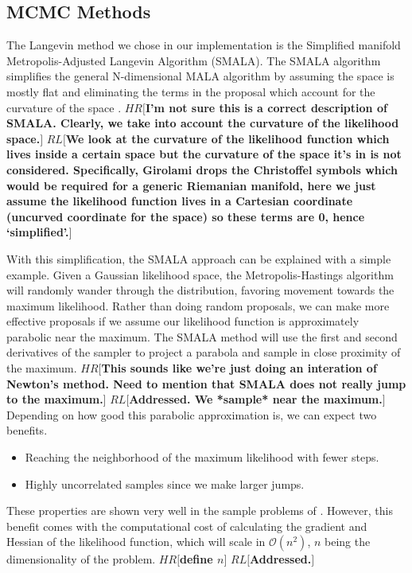 \documentclass{aa}
\def\memohr#1{\color{blue}$HR[${\bf #1}$]$ \color{black}}
\def\memorl#1{\color{gray}$RL[${\bf #1}$]$ \color{black}}
\begin{document}
\subsection{MCMC Methods}
The Langevin method we chose in our implementation is the Simplified manifold Metropolis-Adjusted Langevin Algorithm (SMALA). 
The SMALA algorithm simplifies the general N-dimensional MALA algorithm by assuming the space is mostly flat and eliminating the terms in the proposal which account for the curvature of the space \citep{Girolami2011}.
\memohr{I'm not sure this is a correct description of SMALA. Clearly, we take into account the curvature of the likelihood space.}
\memorl{We look at the curvature of the likelihood function which lives inside a certain space but the curvature of the space it's in is not considered. Specifically, Girolami drops the Christoffel symbols which would be required for a generic Riemanian manifold, here we just assume the likelihood function lives in a Cartesian coordinate (uncurved coordinate for the space) so these terms are 0, hence `simplified'.}

With this simplification, the SMALA approach can be explained with a simple example. 
Given a Gaussian likelihood space, the Metropolis-Hastings algorithm will randomly wander through the distribution, favoring movement towards the maximum likelihood.
Rather than doing random proposals, we can make more effective proposals if we assume our likelihood function is approximately parabolic near the maximum. 
The SMALA method will use the first and second derivatives of the sampler to project a parabola and sample in close proximity of the maximum. 
\memohr{This sounds like we're just doing an interation of Newton's method. Need to mention that SMALA does not really jump to the maximum.}
\memorl{Addressed. We *sample* near the maximum.}
Depending on how good this parabolic approximation is, we can expect two benefits.
\begin{itemize}
\item Reaching the neighborhood of the maximum likelihood with fewer steps.
\item Highly uncorrelated samples since we make larger jumps.
\end{itemize}
These properties are shown very well in the sample problems of \cite{Girolami2011}. 
However, this benefit comes with the computational cost of calculating the gradient and Hessian of the likelihood function, which will scale in $\mathcal{O}(n^2)$, $n$ being the dimensionality of the problem. 
\memohr{define $n$}
\memorl{Addressed.}
\end{document}
